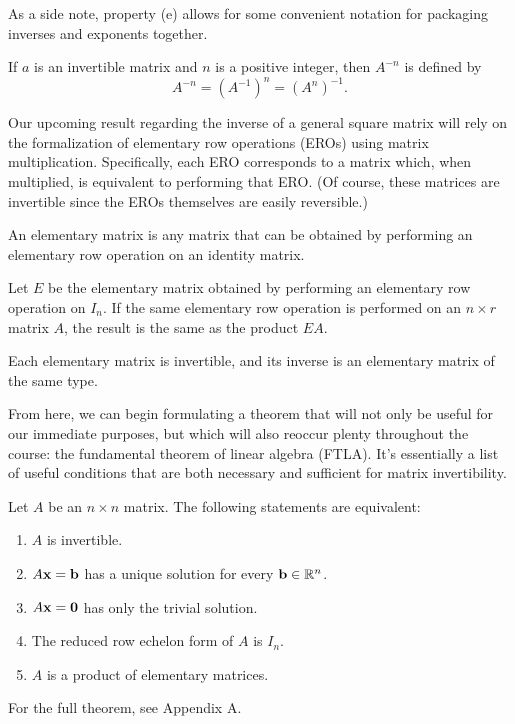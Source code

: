 \documentclass[../m073main.tex]{subfiles}
\begin{document}
As a side note, property (e) allows for some convenient notation for packaging inverses and exponents together.

\begin{definition}
	If $a$ is an invertible matrix and $n$ is a positive integer, then $A^{-n}$ is defined by
	\[ A^{-n} = (A^{-1})^n = (A^n)^{-1}. \]
\end{definition}

Our upcoming result regarding the inverse of a general square matrix will rely on the formalization of elementary row operations (EROs) using matrix multiplication.
Specifically, each ERO corresponds to a matrix which, when multiplied, is equivalent to performing that ERO.
(Of course, these matrices are invertible since the EROs themselves are easily reversible.)

\begin{definition}
	An elementary matrix is any matrix that can be obtained by performing an elementary row operation on an identity matrix.
\end{definition}

\begin{theorem}
	Let $E$ be the elementary matrix obtained by performing an elementary row operation on $I_n$.
	If the same elementary row operation is performed on an $n\times r$ matrix $A$, the result is the same as the product $EA$.
\end{theorem}

\begin{theorem}
	Each elementary matrix is invertible, and its inverse is an elementary matrix of the same type.
\end{theorem}

From here, we can begin formulating a theorem that will not only be useful for our immediate purposes, but which will also reoccur plenty throughout the course: the fundamental theorem of linear algebra (FTLA).
It's essentially a list of useful conditions that are both necessary and sufficient for matrix invertibility.

\pagebreak

\begin{theorem}
	Let $A$ be an $n\times n$ matrix.
	The following statements are equivalent:
	\begin{enumerate}[label=(\alph*)]
		\item $A$ is invertible.
		\item $A\mathbf{x}= \mathbf{b}$ has a unique solution for every $\mathbf{b}\in\mathbb{R}^n$.
		\item $A\mathbf{x}=\mathbf{0}$ has only the trivial solution.
		\item The reduced row echelon form of $A$ is $I_n$.
		\item $A$ is a product of elementary matrices.
	\end{enumerate}
	For the full theorem, see Appendix A.
\end{theorem}
\end{document}
